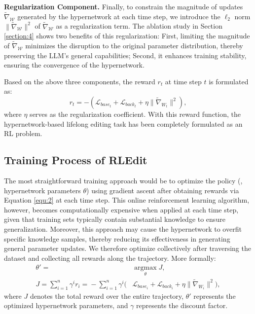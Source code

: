 \textbf{Regularization Component.} Finally, to constrain the magnitude of updates $\tilde{\nabla}_\mathcal{W}$ generated by the hypernetwork at each time step, we introduce the $\ell_2$ norm $\|\tilde{\nabla}_\mathcal{W}\|^2$ of $\tilde{\nabla}_\mathcal{W}$ as a regularization term. The ablation study in Section \ref{section:4} shows two benefits of this regularization: First, limiting the magnitude of $\tilde{\nabla}_\mathcal{W}$ minimizes the disruption to the original parameter distribution, thereby preserving the LLM's general capabilities; Second, it enhances training stability, ensuring the convergence of the hypernetwork.

Based on the above three components, the reward $r_t$ at time step $t$ is formulated as:
\begin{equation}
r_t=-(\mathcal{L}_{\mathit{base}_t}+\mathcal{L}_{\mathit{back}_t}+\eta\|\tilde{\nabla}_{W_t}\|^2),
\label{equ:2}
\end{equation}
where $\eta$ serves as the regularization coefficient. With this reward function, the hypernetwork-based lifelong editing task has been completely formulated as an RL problem.


\subsection{Training Process of RLEdit}
\label{section:3.2}
The most straightforward training approach would be to optimize the policy (\ie, hypernetwork parameters $\theta$) using gradient ascent after obtaining rewards via Equation \ref{equ:2} at each time step. This online reinforcement learning algorithm, however, becomes computationally expensive when applied at each time step, given that training sets typically contain substantial knowledge to ensure generalization. Moreover, this approach may cause the hypernetwork to overfit specific knowledge samples, thereby reducing its effectiveness in generating general parameter updates. We therefore optimize collectively after traversing the dataset and collecting all rewards along the trajectory. More formally:
\begin{align}
\theta'=&\mathop{\arg\max}\limits_{\theta}J, \\
J{=}\!\sum_{i=1}^{n}{\gamma^i r_i}{=}\!-\!\!\sum_{i=1}^n\gamma^i(&\mathcal{L}_{base_i}{+}\mathcal{L}_{back_i}{+}\eta\|\tilde{\nabla}_{W_i}\|^2),
\label{equ:3}
\end{align}
where $J$ denotes the total reward over the entire trajectory, $\theta'$ represents the optimized hypernetwork parameters, and $\gamma$ represents the discount factor.

